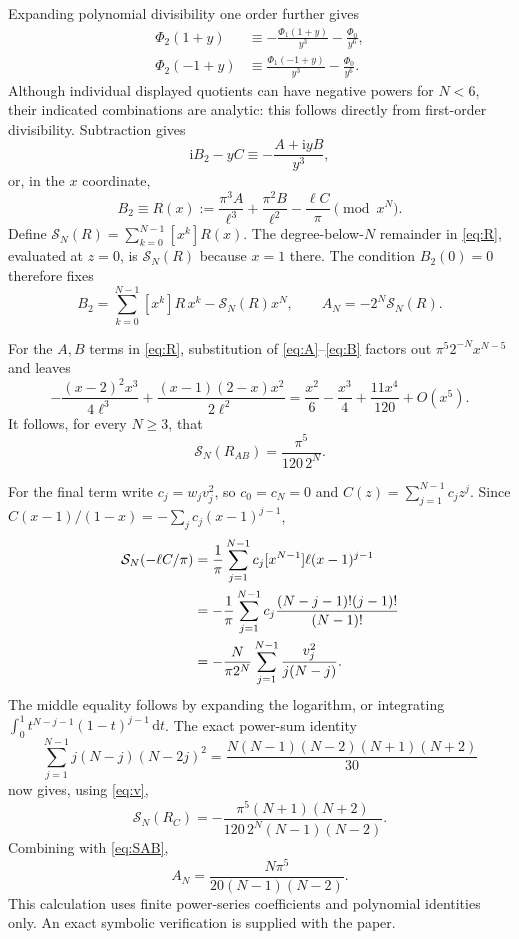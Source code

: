\documentclass[11pt,a4paper]{article}
\theoremstyle{remark}\newtheorem{remark}[theorem]{Remark}
\newcommand{\dd}{\,\mathrm d}\newcommand{\ii}{\mathrm i}
\begin{document}
Expanding polynomial divisibility one order further gives
\begin{align*}
 \Phi_2(1+y)&\equiv-\frac{\Phi_1(1+y)}{y^3}-\frac{\Phi_0}{y^6},\\
 \Phi_2(-1+y)&\equiv\frac{\Phi_1(-1+y)}{y^3}-\frac{\Phi_0}{y^6}.
\end{align*}
Although individual displayed quotients can have negative powers for $N<6$, their indicated combinations are analytic: this follows directly from first-order divisibility. Subtraction gives
\[
 \ii B_2-yC\equiv-\frac{A+\ii yB}{y^3},
\]
or, in the $x$ coordinate,
\begin{equation}\label{eq:R}
 B_2\equiv R(x):=\frac{\pi^3A}{\ell^3}
                +\frac{\pi^2B}{\ell^2}-\frac{\ell C}{\pi}\pmod{x^N}.
\end{equation}
Define $\mathcal S_N(R)=\sum_{k=0}^{N-1}[x^k]R(x)$. The degree-below-$N$ remainder in \eqref{eq:R}, evaluated at $z=0$, is $\mathcal S_N(R)$ because $x=1$ there. The condition $B_2(0)=0$ therefore fixes
\[
 B_2=\sum_{k=0}^{N-1}[x^k]R\,x^k-\mathcal S_N(R)x^N,
 \qquad A_N=-2^N\mathcal S_N(R).
\]

For the $A,B$ terms in \eqref{eq:R}, substitution of \eqref{eq:A}--\eqref{eq:B} factors out $\pi^5 2^{-N}x^{N-5}$ and leaves
\[
 -\frac{(x-2)^2x^3}{4\ell^3}
 +\frac{(x-1)(2-x)x^2}{2\ell^2}
 =\frac{x^2}{6}-\frac{x^3}{4}+\frac{11x^4}{120}+O(x^5).
\]
It follows, for every $N\ge3$, that
\begin{equation}\label{eq:SAB}
 \mathcal S_N(R_{AB})=\frac{\pi^5}{120\,2^N}.
\end{equation}

For the final term write $c_j=w_jv_j^2$, so $c_0=c_N=0$ and $C(z)=\sum_{j=1}^{N-1}c_jz^j$. Since
$C(x-1)/(1-x)=-\sum_jc_j(x-1)^{j-1}$,
\begin{align}
 \mathcal S_N(-\ell C/\pi)
 &=\frac1\pi\sum_{j=1}^{N-1}c_j[x^{N-1}]\ell(x-1)^{j-1}\notag\\
 &=-\frac1\pi\sum_{j=1}^{N-1}c_j
           \frac{(N-j-1)!(j-1)!}{(N-1)!}\notag\\
 &=-\frac{N}{\pi 2^N}\sum_{j=1}^{N-1}\frac{v_j^2}{j(N-j)}.\label{eq:SC}
\end{align}
The middle equality follows by expanding the logarithm, or integrating
$\int_0^1 t^{N-j-1}(1-t)^{j-1}\dd t$. The exact power-sum identity
\begin{equation}\label{eq:sum}
 \sum_{j=1}^{N-1}j(N-j)(N-2j)^2
   =\frac{N(N-1)(N-2)(N+1)(N+2)}{30}
\end{equation}
now gives, using \eqref{eq:v},
\[
 \mathcal S_N(R_C)=
 -\frac{\pi^5(N+1)(N+2)}{120\,2^N(N-1)(N-2)}.
\]
Combining with \eqref{eq:SAB},
\begin{equation}\label{eq:AN}
 \boxed{A_N=\frac{N\pi^5}{20(N-1)(N-2)}.}
\end{equation}
This calculation uses finite power-series coefficients and polynomial identities only. An exact symbolic verification is supplied with the paper.
\end{document}
